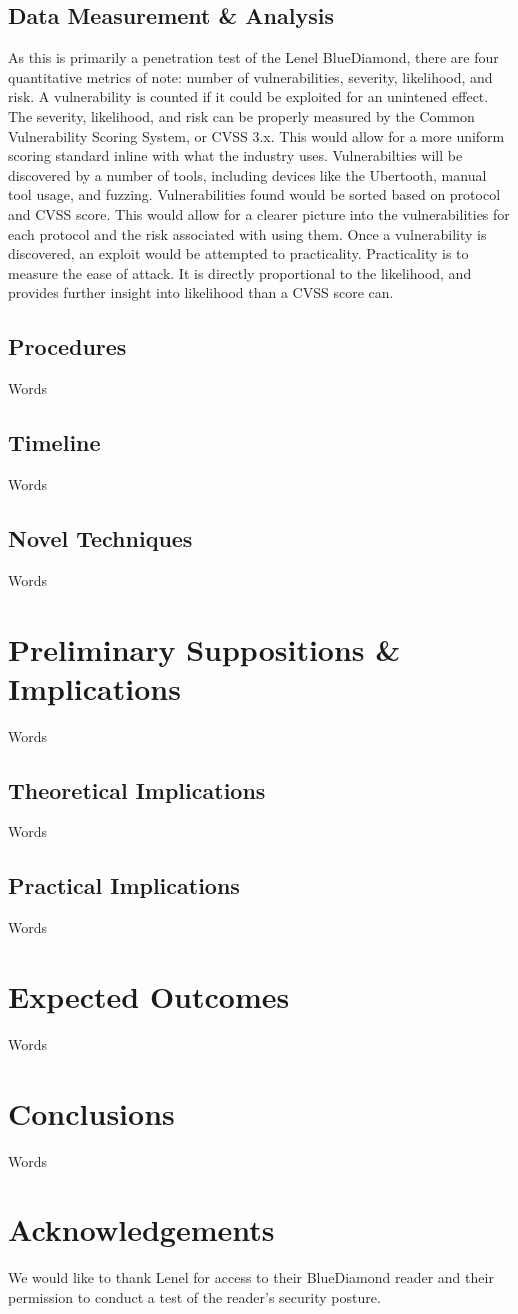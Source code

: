 \documentclass[10pt,twocolumn,letterpaper]{article}
\begin{document}
\subsection{Data Measurement \& Analysis}
As this is primarily a penetration test of the Lenel BlueDiamond, there are four quantitative metrics of note: number of vulnerabilities, severity, likelihood, and risk. A vulnerability is counted if it could be exploited for an unintened effect. The severity, likelihood, and risk can be properly measured by the Common Vulnerability Scoring System, or CVSS 3.x. This would allow for a more uniform scoring standard inline with what the industry uses. Vulnerabilties will be discovered by a number of tools, including devices like the Ubertooth, manual tool usage, and fuzzing. Vulnerabilities found would be sorted based on protocol and CVSS score. This would allow for a clearer picture into the vulnerabilities for each protocol and the risk associated with using them. Once a vulnerability is discovered, an exploit would be attempted to practicality. Practicality is to measure the ease of attack. It is directly proportional to the likelihood, and provides further insight into likelihood than a CVSS score can.

\subsection{Procedures}
Words

\subsection{Timeline}
Words

\subsection{Novel Techniques}
Words

\section{Preliminary Suppositions \& Implications}
Words

\subsection{Theoretical Implications}
Words

\subsection{Practical Implications}
Words

\section{Expected Outcomes}
Words

\section{Conclusions}
Words

\section{Acknowledgements}
We would like to thank Lenel for access to their BlueDiamond reader and their permission to conduct a test of the reader's security posture.



\end{document}
